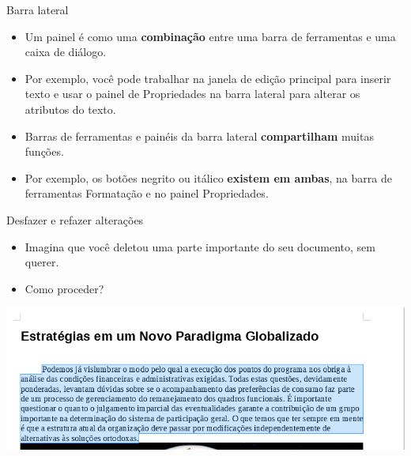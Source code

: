 \begin{frame}{Barra lateral}
	\begin{block}{}
		\begin{itemize}
			\item Um painel é como uma \textbf{combinação} entre uma barra de ferramentas e uma caixa de diálogo.
			\item Por exemplo, você pode trabalhar na janela de edição principal para inserir texto e usar o painel de Propriedades na barra lateral para alterar os atributos do texto.
			\item Barras de ferramentas e painéis da barra lateral \textbf{compartilham} muitas funções.
			\item Por exemplo, os botões negrito ou itálico \textbf{existem em ambas}, na barra de ferramentas Formatação e no painel Propriedades.
		\end{itemize}
	\end{block}

\end{frame}


\begin{frame}{Desfazer e refazer alterações}
	\begin{block}{}
		\begin{itemize}
			\item Imagina que você deletou uma parte importante do seu documento, sem querer.
			\item Como proceder?
		\end{itemize}
	\end{block}

	\bigskip

	\centering
	\includegraphics[width=1\linewidth]{Figuras/Ch04/fig37}
\end{frame}


